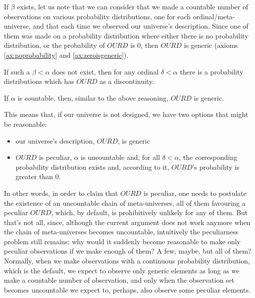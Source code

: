 \documentclass[a4paper
,draft
]{article}
\def\our_description{OURD}
\begin{document}


If $\beta$ exists, let us note that we can consider that
we made a countable number of observations on various
probability distributions, one for each ordinal/meta-universe, and that
each time we observed our universe's description.
Since one of them was made on a probability distribution
where either there is no probability distribution, or the probability
of $\our_description$ is $0$, then $\our_description$ is
generic (axioms \ref{ax:noprobability} and \ref{ax:zeroisgeneric}).

If such a $\beta<\alpha$ does not exist, then for any ordinal $\delta<\alpha$
there is a probability distributions which has $OURD$ as a discontinuity.

If $\alpha$ is countable, then,
similar to the above reasoning, $\our_description$ is generic.

This means that, if our universe is not designed, we have two options
that might be reasonable:
\begin{itemize}
    \item our universe's description, $\our_description$, is generic
    \item $\our_description$ is peculiar, $\alpha$ is uncountable and,
          for all $\delta < \alpha$, the corresponding probability distribution
          exists and, according to it, $\our_description$'s probability is
          greater than $0$.
\end{itemize}

In other words, in order to claim that $\our_description$ is peculiar,
one needs to postulate the
existence of an uncountable chain of meta-universes, all of them favouring a
peculiar $\our_description$, which, by default,
is prohibitively unlikely for any of them.
But that's not all, since, although the
current argument does not work anymore when the chain of
meta-universes becomes uncountable, intuitively the peculiarness problem
still remains: why would it suddenly become reasonable to make
only peculiar observations if we make enough of them? A few, maybe, but all
of them? Normally, when we make
observations with a continuous probability distribution, which is the default,
we expect to observe only generic elements as long as we make a
countable number of observation, and only when the observation set
becomes uncountable we expect to, perhaps, also observe some peculiar elements.
\end{document}
